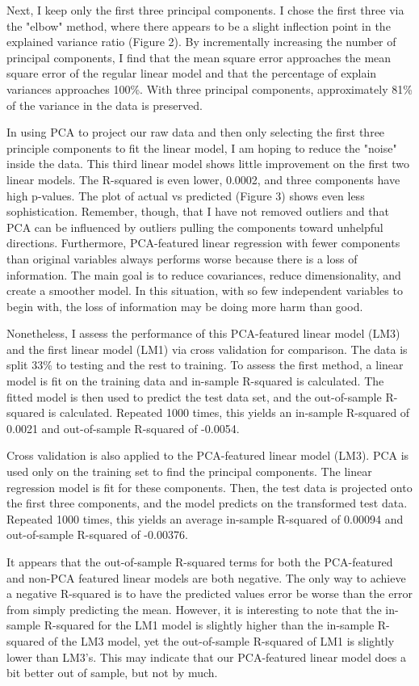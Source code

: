 \documentclass[10pt,twocolumn]{article}
\begin{document}
Next, I keep only the first three principal components. I chose the first
three via the "elbow" method, where there appears to be a slight inflection point
in the explained variance ratio (Figure 2). By incrementally increasing the number
of principal components, I find that the mean square error approaches the mean
square error of the regular linear model and that the percentage of explain variances
approaches 100\%. With three principal components, approximately 81\% of the
variance in the data is preserved.

In using PCA to project our raw data and then only selecting the first three
principle components to fit the linear model, I am hoping to reduce the
"noise" inside the data. This third linear model shows little improvement
on the first two linear models. The R-squared is even lower, 0.0002, and three components
have high p-values. The plot of actual vs predicted (Figure 3) shows even less sophistication.
Remember, though, that I have not removed outliers and that PCA can be influenced by outliers
pulling the components toward unhelpful directions. Furthermore, PCA-featured
linear regression with fewer components than original variables always performs
worse because there is a loss of information. The main goal is to reduce covariances,
reduce dimensionality, and create a smoother model. In this situation, with so few
independent variables to begin with, the loss of information may be doing
more harm than good.

Nonetheless, I assess the performance of this PCA-featured linear model (LM3)
and the first linear model (LM1) via cross validation for comparison.
The data is split 33\% to testing and the rest to training. To assess the
first method, a linear model is fit on the training data and in-sample R-squared
is calculated. The fitted model is then used to predict the test data set, and
the out-of-sample R-squared is calculated. Repeated 1000 times, this yields an
in-sample R-squared of 0.0021 and out-of-sample R-squared of -0.0054.

Cross validation is also applied to the PCA-featured linear model (LM3). PCA is used
only on the training set to find the principal components. The linear regression model
is fit for these components. Then, the test data is projected onto the first three
components, and the model predicts on the transformed test data. Repeated 1000 times,
this yields an average in-sample R-squared of 0.00094 and out-of-sample R-squared of
-0.00376.

It appears that the out-of-sample R-squared terms for both the PCA-featured and non-PCA featured linear models
are both negative. The only way to achieve a negative R-squared is to have the
predicted values error be worse than the error from simply predicting the mean.
However, it is interesting to note that the in-sample R-squared for the
LM1 model is slightly higher than the in-sample R-squared of the LM3 model,
yet the out-of-sample R-squared of LM1 is slightly lower than LM3's. This may indicate that our
PCA-featured linear model does a bit better out of sample, but not by much.
\end{document}
